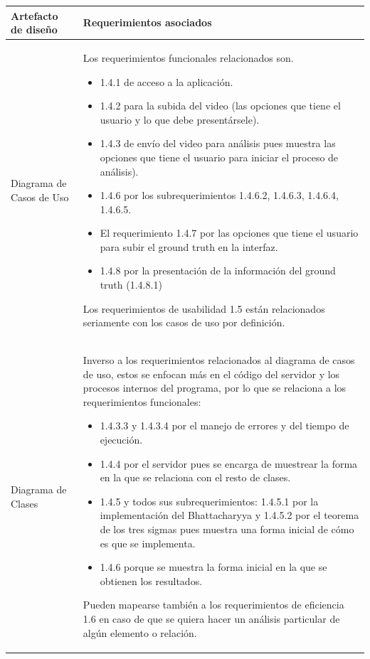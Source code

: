 \documentclass[a4paper]{article}
\begin{document}
{\begin{table}[h!]
\begin{tabularx}{\textwidth}{|p{5cm}|p{9.1cm}|}
\hline
  \textbf{Artefacto de diseño}& 
  \textbf{Requerimientos asociados}\\

  \hline
  Diagrama de Casos de Uso&
  Los requerimientos funcionales relacionados son.
  \begin{itemize}
\item 1.4.1 de acceso a la aplicación.     
\item 1.4.2 para la subida del video (las opciones que tiene el  usuario y lo que debe presentársele).     
\item 1.4.3 de envío del video para análisis pues muestra las opciones que tiene el usuario para iniciar el proceso de análisis). 
\item 1.4.6 por los subrequerimientos 1.4.6.2, 1.4.6.3, 1.4.6.4, 1.4.6.5.     
\item El requerimiento 1.4.7 por las opciones que tiene el usuario para subir el ground truth en la interfaz.     
\item 1.4.8 por la presentación de la información del ground truth (1.4.8.1) 
  \end{itemize} 
  
  Los requerimientos de usabilidad 1.5 están relacionados seriamente con los casos de uso por definición. 
  
\\
  \hline
  Diagrama de Clases&
  Inverso a los requerimientos relacionados al diagrama de casos de uso, estos se enfocan más en el código del servidor y los procesos internos del programa, por lo que se relaciona a los requerimientos funcionales: 		
  \begin{itemize}
\item 1.4.3.3 y 1.4.3.4 por el manejo de errores y del tiempo de ejecución. 
\item 1.4.4 por el servidor pues se encarga de muestrear la forma en la que se relaciona con el resto de clases. 
\item 1.4.5 y todos sus subrequerimientos: 1.4.5.1 por la implementación del Bhattacharyya y 1.4.5.2 por el teorema de los tres sigmas pues muestra una forma inicial de cómo es que se implementa. \item 1.4.6 porque se muestra la forma inicial en la que se obtienen los resultados.
  \end{itemize} 
  
  Pueden mapearse también a los requerimientos de eficiencia 1.6 en caso de que se quiera hacer un análisis particular de algún elemento o relación. 
\\


\end{tabularx}
\end{table}}
\end{document}

